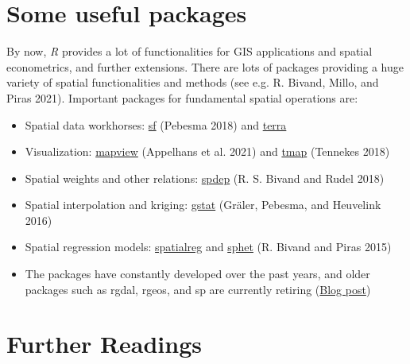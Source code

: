 \documentclass[
  letterpaper,
  DIV=11,
  numbers=noendperiod]{scrreprt}
\begin{document}
\hypertarget{some-useful-packages}{%
\section*{Some useful packages}\label{some-useful-packages}}


By now, \emph{R} provides a lot of functionalities for GIS applications
and spatial econometrics, and further extensions. There are lots of
packages providing a huge variety of spatial functionalities and methods
(see e.g. R. Bivand, Millo, and Piras 2021). Important packages for
fundamental spatial operations are:

\begin{itemize}
\item
  Spatial data workhorses:
  \href{https://cran.r-project.org/web/packages/sf/index.html}{sf}
  (Pebesma 2018) and
  \href{https://cran.r-project.org/web/packages/terra/index.html}{terra}
\item
  Visualization:
  \href{https://cran.r-project.org/web/packages/mapview/index.html}{mapview}
  (Appelhans et al. 2021) and
  \href{https://cran.r-project.org/web/packages/tmap/index.html}{tmap}
  (Tennekes 2018)
\item
  Spatial weights and other relations:
  \href{https://cran.r-project.org/web/packages/stars/index.html}{spdep}
  (R. S. Bivand and Rudel 2018)
\item
  Spatial interpolation and kriging:
  \href{https://cran.r-project.org/web/packages/gstat/index.html}{gstat}
  (Gräler, Pebesma, and Heuvelink 2016)
\item
  Spatial regression models:
  \href{https://cran.r-project.org/web/packages/spatialreg/index.html}{spatialreg}
  and
  \href{https://cran.r-project.org/web/packages/sphet/index.html}{sphet}
  (R. Bivand and Piras 2015)
\item
  The packages have constantly developed over the past years, and older
  packages such as rgdal, rgeos, and sp are currently retiring
  (\href{https://geocompx.org/post/2023/rgdal-retirement/}{Blog post})
\end{itemize}

\hypertarget{further-readings}{%
\section*{Further Readings}\label{further-readings}}
\end{document}
